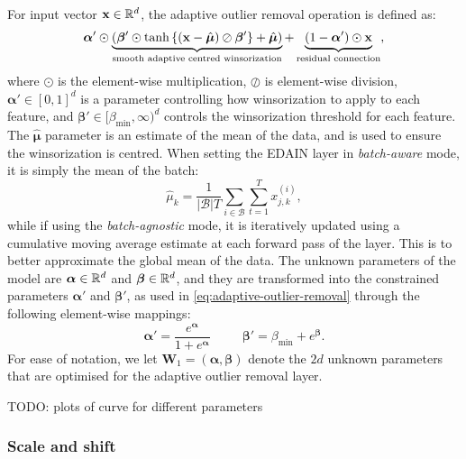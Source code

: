 \documentclass{statsmsc}
\begin{document}
For input vector $\mathbf{x} \in \mathbb{R}^d$, the adaptive outlier removal operation is defined as:
\begin{equation}\label{eq:adaptive-outlier-removal}
    \bm\alpha' \odot \underbrace{\left(\bm\beta' \odot 
        \tanh\left\{(\mathbf{x}-\hat{\bm\mu}) \oslash \bm\beta'  \right\}+\hat{\bm\mu}
\right)}_{\text{smooth adaptive centred winsorization}}
    +\underbrace{\left(1-\bm\alpha' \right) \odot \mathbf{x}}_{\text{residual connection}},
\end{equation}
where $\odot$ is the element-wise multiplication, $\oslash$ is element-wise division,
$\bm\alpha' \in [0,1]^d$ is a parameter controlling how winsorization to apply to each feature,
and $\bm\beta' \in [\beta_{\text{min}},\infty)^d$ controls the winsorization threshold for
each feature. The $\hat{\bm\mu}$ parameter is an estimate of the mean of the data, and is used
to ensure the winsorization is centred. When setting the \ac{EDAIN} layer in \textit{batch-aware}
mode, it is simply the mean of the batch:
\begin{equation}
    \hat{\mu}_k=\frac{1}{|\mathcal{B}| T} \sum_{i \in \mathcal{B}} \sum_{t=1}^T x_{j,k}^{(i)},
\end{equation}
while if using the \textit{batch-agnostic} mode, it is iteratively updated using a cumulative
moving average estimate at each forward pass of the layer. This is to better approximate the
global mean of the data.
The unknown parameters of the model are $\bm\alpha \in \mathbb{R}^d$ and $\bm\beta \in \mathbb{R}^d$, and they
are transformed into the constrained parameters $\bm\alpha'$ and $\bm\beta'$, as used in
\cref{eq:adaptive-outlier-removal} through the following element-wise mappings:
\begin{equation}
    \bm\alpha'=\frac{e^{\bm\alpha}}{1+e^{\bm\alpha}} \;\;\;\;\;\;\;\;\;
    \bm\beta'=\beta_{\text{min}}+e^{\bm\beta}.
\end{equation}
For ease of notation, we let $\mathbf{W}_1=(\bm\alpha, \bm\beta)$ denote the $2d$ unknown
parameters that are optimised for the adaptive outlier removal layer.

TODO: plots of curve for different parameters


\subsubsection{Scale and shift}%
\label{ssub:Scale and shift}

\end{document}

